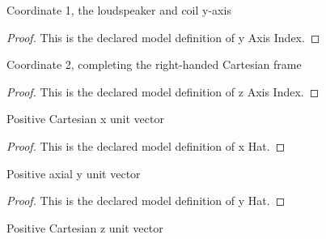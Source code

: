 \begin{definition}
  \label{def:physics:phyx-mini-0950:phyxminiproblems-problemphyxmini0950-yaxisindex}
  Coordinate 1, the loudspeaker and coil y-axis
\end{definition}
\begin{proof}
  This is the declared model definition of y Axis Index.
\end{proof}
\begin{definition}
  \label{def:physics:phyx-mini-0950:phyxminiproblems-problemphyxmini0950-zaxisindex}
  Coordinate 2, completing the right-handed Cartesian frame
\end{definition}
\begin{proof}
  This is the declared model definition of z Axis Index.
\end{proof}
\begin{definition}[x Hat]
  \label{def:physics:phyx-mini-0950:phyxminiproblems-problemphyxmini0950-xhat}
  Positive Cartesian x unit vector
\end{definition}
\begin{proof}
  This is the declared model definition of x Hat.
\end{proof}
\begin{definition}[y Hat]
  \label{def:physics:phyx-mini-0950:phyxminiproblems-problemphyxmini0950-yhat}
  Positive axial y unit vector
\end{definition}
\begin{proof}
  This is the declared model definition of y Hat.
\end{proof}
\begin{definition}[z Hat]
  \label{def:physics:phyx-mini-0950:phyxminiproblems-problemphyxmini0950-zhat}
  Positive Cartesian z unit vector
\end{definition}
